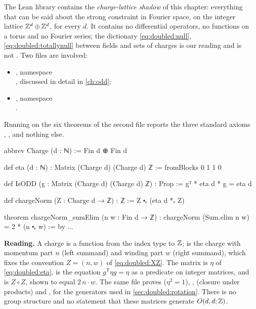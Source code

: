 The Lean library contains the \emph{charge-lattice shadow} of this chapter: everything that
can be said about the strong constraint in Fourier space, on the integer lattice
$\mathbb{Z}^d\oplus\mathbb{Z}^d$, for every $d$. It contains no differential operators, no functions on a
torus and no Fourier series; the dictionary \eqref{eq:doubled:null},
\eqref{eq:doubled:totallynull} between fields and sets of charges is our reading and is not
\TA. Two files are involved:
\begin{itemize}[leftmargin=*]
\item {}, namespace\\ ,
 discussed in detail in \cref{ch:odd};
\item {}, namespace\\ .
\end{itemize}
Running  on the six theorems of the second file reports the three
standard axioms , ,  and nothing else.

\begin{leanbox}
\begin{leancode}
abbrev Charge (d : ℕ) := Fin d ⊕ Fin d

def eta (d : ℕ) : Matrix (Charge d) (Charge d) ℤ := fromBlocks 0 1 1 0

def IsODD (g : Matrix (Charge d) (Charge d) ℤ) : Prop := gᵀ * eta d * g = eta d

def chargeNorm (Z : Charge d → ℤ) : ℤ := Z ⬝ᵥ (eta d *ᵥ Z)

theorem chargeNorm_sumElim (n w : Fin d → ℤ) :
    chargeNorm (Sum.elim n w) = 2 * (n ⬝ᵥ w) := by ...
\end{leancode}
\textbf{Reading.} A charge is a function from the index type  to $\mathbb{Z}$;
 is the charge with momentum part $n$ (left summand) and winding part $w$
(right summand), which fixes the convention $Z=(n,w)$ of \eqref{eq:doubled:XZ}. The matrix
 is $\eta$ of \eqref{eq:doubled:eta},  is the equation
$g^{\mathsf T}\eta g=\eta$ as a predicate on integer matrices, and  is
$Z\circ Z$, shown to equal $2\,n\cdot w$. The same file proves 
($\eta^2=1$), ,  (closure under products) and
,  for the generators used in
\cref{sec:doubled:rotation}. There is no group structure and no statement that these matrices
generate $O(d,d;\mathbb{Z})$.
\end{leanbox}


